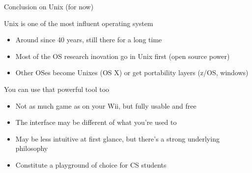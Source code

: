 \begin{frame}{Conclusion on Unix (for now)}
  \begin{block}{Unix is one of the most influent operating system}
    \begin{itemize}
    \item Around since 40 years, still there for a long time
    \item Most of the OS research inovation go in Unix first
      (open source power)
    \item Other OSes become Unixes (OS X) or get portability layers (z/OS,
      windows) 
    \end{itemize}
  \end{block}

  \begin{block}{You can use that powerful tool too}
    \begin{itemize}
    \item Not as much game as on your Wii, but fully usable and free
    \item The interface may be different of what you're used to
    \item May be less intuitive at first glance, but there's a strong
      underlying philosophy
    \item Constitute a playground of choice for CS students
    \end{itemize}
  \end{block}

\end{frame}


